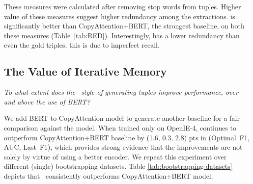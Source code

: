         These measures were calculated after removing stop words from tuples.  Higher value of these measures suggest higher redundancy among the extractions.  \shortname{} is significantly better than CopyAttention+BERT, the strongest baseline, on both these measures (Table~\ref{tab:RED}). Interestingly, \shortname{} has a lower redundancy than even the gold triples; this is due to imperfect recall.


        \begin{table}[h]
            \caption{Measuring redundancy of extractions. MNO stands for Mean Number of Occurrences. IOU stands for Intersection over Union.}
            \label{tab:RED}
        \end{table}

        \vspace{0.5ex}
    \subsection{The Value of Iterative Memory}

        \emph{To what extent does the \shortname~style of generating tuples improve performance, over and above the use of BERT?} 

        We add BERT to CopyAttention model to generate another baseline for a fair comparison against the \shortname{} model. When trained only on OpenIE-4, \shortname{} continues to outperform CopyAttention+BERT baseline by (1.6, 0.3, 2.8) pts in (Optimal~F1, AUC, Last~F1), which provides strong evidence that the improvements are not solely by virtue of using a better encoder.
        We repeat this experiment over different (single) bootstrapping datasets. Table \ref{tab:bootstrapping-datasets} depicts that \shortname~consistently outperforms CopyAttention+BERT model.

